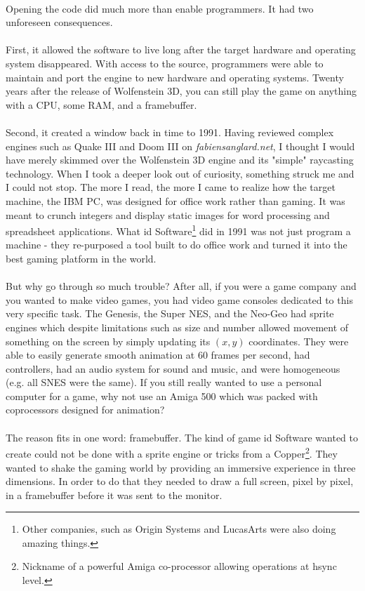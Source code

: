 \\
Opening the code did much more than enable programmers. It had two unforeseen consequences.\\
\\
First, it allowed the software to live long after the target hardware and operating system disappeared. With access to the source, programmers were able to maintain and port the engine to new hardware and operating systems. Twenty years after the release of Wolfenstein 3D, you can still play the game on anything with a CPU, some RAM, and a framebuffer. \\
\\
Second, it created a window back in time to 1991. Having reviewed complex engines such as Quake III and Doom III on \emph{fabiensanglard.net}, I thought I would have merely skimmed over the Wolfenstein 3D engine and its "simple" raycasting technology. When I took a deeper look out of curiosity, something struck me and I could not stop. The more I read, the more I came to realize how the target machine, the IBM PC, was designed for office work rather than gaming. It was meant to crunch integers and display static images for word processing and spreadsheet applications. 
What id Software\footnote{Other companies, such as Origin Systems and LucasArts were also doing amazing things.} did in 1991 was not just program a machine - they re-purposed a tool built to do office work and turned it into the best gaming platform in the world.\\
\\
But why go through so much trouble? After all, if you were a game company and you wanted to make video games, you had video game consoles dedicated to this very specific task. The Genesis, the Super NES, and the Neo-Geo had sprite engines\label{sprite_engine_ref} which despite limitations such as size and number allowed movement of something on the screen by simply updating its $(x,y)$ coordinates. They were able to easily generate smooth animation at 60 frames per second, had controllers, had an audio system for sound and music, and were homogeneous (e.g. all SNES were the same). If you still really wanted to use a personal computer for a game, why not use an Amiga 500 which was packed with coprocessors designed for animation?\\
\\
The reason fits in one word: framebuffer. The kind of game id Software wanted to create could not be done with a sprite engine or tricks from a Copper\footnote{Nickname of a powerful Amiga co-processor allowing operations at hsync level.}. They wanted to shake the gaming world by providing an immersive experience in three dimensions. In order to do that they needed to draw a full screen, pixel by pixel, in a framebuffer before it was sent to the monitor. \\
